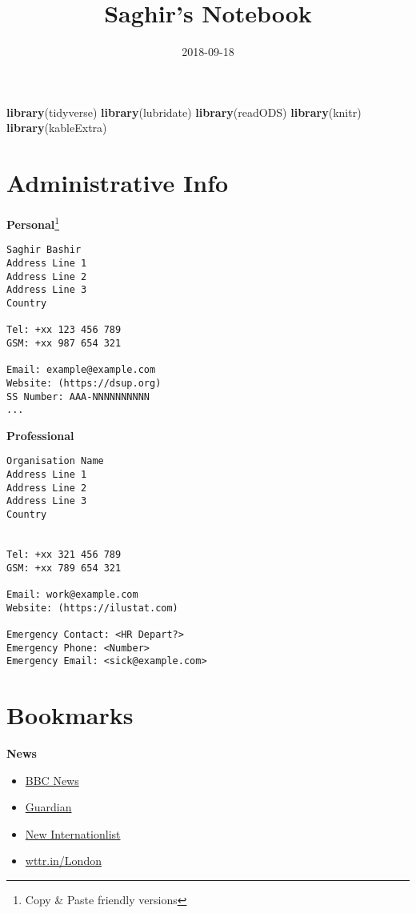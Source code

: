 \documentclass[]{book}
\title{Saghir's Notebook}
\author{}
\date{2018-09-18}
\newenvironment{Shaded}{\begin{snugshade}}{\end{snugshade}}
\newcommand{\KeywordTok}[1]{\textcolor[rgb]{0.13,0.29,0.53}{\textbf{#1}}}
\newcommand{\NormalTok}[1]{#1}
\providecommand{\tightlist}{%
  \setlength{\itemsep}{0pt}\setlength{\parskip}{0pt}}
\let\rmarkdownfootnote\footnote%
\def\footnote{\protect\rmarkdownfootnote}
\theoremstyle{definition}
\theoremstyle{definition}
\theoremstyle{definition}
\theoremstyle{remark}
\begin{document}
\maketitle

{
\setcounter{tocdepth}{1}
\tableofcontents
}
\begin{Shaded}
\begin{Highlighting}[]
\KeywordTok{library}\NormalTok{(tidyverse)}
\KeywordTok{library}\NormalTok{(lubridate)}
\KeywordTok{library}\NormalTok{(readODS)}
\KeywordTok{library}\NormalTok{(knitr)}
\KeywordTok{library}\NormalTok{(kableExtra)}
\end{Highlighting}
\end{Shaded}

\chapter{Administrative Info}\label{administrative-info}

\textbf{Personal}\footnote{Copy \& Paste friendly versions}

\begin{verbatim}
Saghir Bashir
Address Line 1
Address Line 2
Address Line 3
Country

Tel: +xx 123 456 789
GSM: +xx 987 654 321

Email: example@example.com
Website: (https://dsup.org)
SS Number: AAA-NNNNNNNNNN
...
\end{verbatim}

\textbf{Professional}

\begin{verbatim}
Organisation Name
Address Line 1
Address Line 2
Address Line 3
Country


Tel: +xx 321 456 789
GSM: +xx 789 654 321

Email: work@example.com
Website: (https://ilustat.com)

Emergency Contact: <HR Depart?>
Emergency Phone: <Number>
Emergency Email: <sick@example.com>
\end{verbatim}

\chapter{Bookmarks}\label{bookmarks}

\textbf{News}

\begin{itemize}
\tightlist
\item
  \href{https://www.bbc.com/news}{BBC News}
\item
  \href{https://theguardian.com}{Guardian}
\item
  \href{https://newint.org/}{New Internationlist}
\item
  \href{http://wttr.in/London}{wttr.in/London}
\end{itemize}
\end{document}
